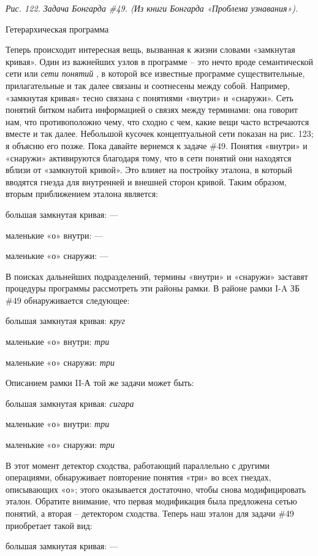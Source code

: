 \documentclass[../main.tex]{subfiles}
\begin{document}
\emph{Рис. 122. Задача Бонгарда \#49. (Из книги Бонгарда «Проблема узнавания»).}

Гетерархическая программа

Теперь происходит интересная вещь, вызванная к жизни словами «замкнутая кривая». Один из важнейших узлов в программе \--- это нечто вроде семантической сети или \emph{сети понятий} , в которой все известные программе существительные, прилагательные и так далее связаны и соотнесены между собой. Например, «замкнутая кривая» тесно связана с понятиями «внутри» и «снаружи». Сеть понятий битком набита информацией о связях между терминами: она говорит нам, что противоположно чему, что сходно с чем, какие вещи часто встречаются вместе и так далее. Небольшой кусочек концептуальной сети показан на рис. 123; я объясню его позже. Пока давайте вернемся к задаче \#49. Понятия «внутри» и «снаружи» активируются благодаря тому, что в сети понятий они находятся вблизи от «замкнутой кривой». Это влияет на постройку эталона, в который вводятся гнезда для внутренней и внешней сторон кривой. Таким образом, вторым приближением эталона является:

большая замкнутая кривая: ---

маленькие «о» внутри: ---

маленькие «о» снаружи: ---

В поисках дальнейших подразделений, термины «внутри» и «снаружи» заставят процедуры программы рассмотреть эти районы рамки. В районе рамки I-A ЗБ \#49 обнаруживается следующее:

большая замкнутая кривая: \emph{круг}

маленькие «о» внутри: \emph{три}

маленькие «о» снаружи: \emph{три}

Описанием рамки II-А той же задачи может быть:

большая замкнутая кривая: \emph{сигара}

маленькие «о» внутри: \emph{три}

маленькие «о» снаружи: \emph{три}

В этот момент детектор сходства, работающий параллельно с другими операциями, обнаруживает повторение понятия «три» во всех гнездах, описывающих «о»; этого оказывается достаточно, чтобы снова модифицировать эталон. Обратите внимание, что первая модификация была предложена сетью понятий, а вторая \--- детектором сходства. Теперь наш эталон для задачи \#49 приобретает такой вид:

большая замкнутая кривая: ---
\end{document}
